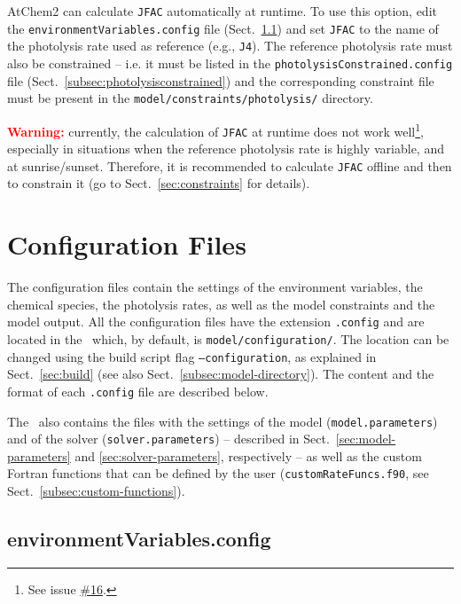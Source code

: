 AtChem2 can calculate \texttt{JFAC} automatically at runtime. To use this option, edit the
\texttt{environmentVariables.config} file (Sect.~\ref{subsec:environmentvariables}) and set
\texttt{JFAC} to the name of the photolysis rate used as reference (e.g., \texttt{J4}). The
reference photolysis rate must also be constrained -- i.e. it must be listed in the
\texttt{photolysisConstrained.config} file (Sect.~\ref{subsec:photolysisconstrained}) and the
corresponding constraint file must be present in the \texttt{model/constraints/photolysis/}
directory.

\medskip \noindent
\textcolor{red}{\bf Warning:} currently, the calculation of \texttt{JFAC} at runtime does not
work well\footnote{See issue \href{https://github.com/AtChem/AtChem2/issues/16}{\#16}.},
especially in situations when the reference photolysis rate is highly variable, and at
sunrise/sunset. Therefore, it is recommended to calculate \texttt{JFAC} offline and then to
constrain it (go to Sect.~\ref{sec:constraints} for details).

\section{Configuration Files} \label{sec:configuration-files}

The configuration files contain the settings of the environment variables, the chemical
species, the photolysis rates, as well as the model constraints and the model output. All the
configuration files have the extension \texttt{.config} and are located in the \configdir\
which, by default, is \texttt{model/configuration/}. The location can be changed using the
build script flag \texttt{--configuration}, as explained in Sect.~\ref{sec:build} (see also
Sect.~\ref{subsec:model-directory}). The content and the format of each \texttt{.config} file
are described below.

The \configdir\ also contains the files with the settings of the model (\texttt{model.parameters})
and of the solver (\texttt{solver.parameters}) -- described in Sect.~\ref{sec:model-parameters}
and \ref{sec:solver-parameters}, respectively -- as well as the custom Fortran functions that
can be defined by the user (\texttt{customRateFuncs.f90}, see Sect.~\ref{subsec:custom-functions}).

\subsection{environmentVariables.config} \label{subsec:environmentvariables}

